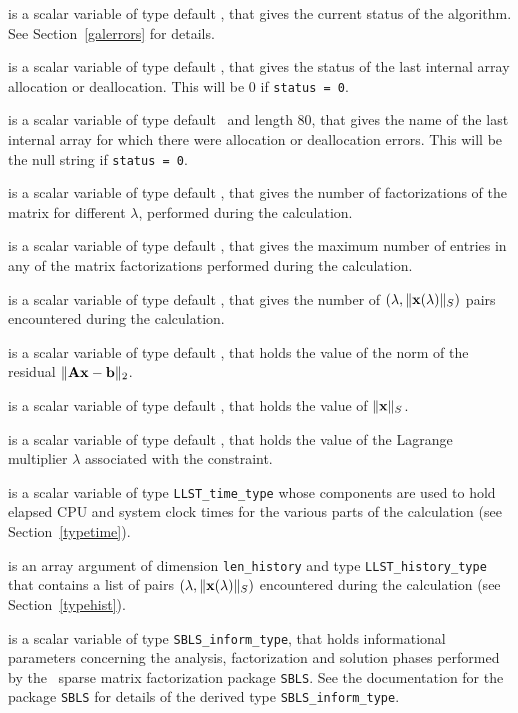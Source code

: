 \documentclass{galahad}
\newcommand{\packagename}{LLST}
\begin{document}
\begin{description}
 is a scalar variable of type default \integer, that gives the
current status of the algorithm. See Section~\ref{galerrors} for details.

 is a scalar variable of type default \integer,
that gives the status of the last internal array allocation
or deallocation. This will be 0 if {\tt status = 0}.

 is a scalar variable of type default \character\
and length 80, that  gives the name of the last internal array
for which there were allocation or deallocation errors.
This will be the null string if {\tt status = 0}.

 is a scalar variable of type default \integer, that
gives the number of factorizations of the matrix \req{kkt}
for different $\lambda$, performed during the calculation.

 is a scalar variable of type default \integer, that
gives the maximum number of entries in any of the matrix factorizations
performed during the calculation.

 is a scalar variable of type default \integer, that gives
the number of $(\lambda,\|{\mathbf{x}}(\lambda)\|_S)$ pairs encountered during the
calculation.

 is a scalar variable of type default \realdp, that holds the
value of the norm of the residual $\| {\mathbf{A}} {\mathbf{x}} - {\mathbf{b}}\|_2$.

 is a scalar variable of type default \realdp,
that holds the value of $\|{\mathbf{x}}\|_S$.

 is a scalar variable of type default \realdp, that holds the
value of the Lagrange multiplier $\lambda$ associated with the constraint.

 is a scalar variable of type {\tt \packagename\_time\_type}
whose components are used to hold elapsed CPU  and system clock times for the
various parts of the calculation (see Section~\ref{typetime}).

 is an array argument of dimension {\tt len\_history} and
type {\tt \packagename\_history\_type} that contains a list of pairs
$(\lambda,\|{\mathbf{x}}(\lambda)\|_S)$ encountered during the
calculation (see Section~\ref{typehist}).

 is a scalar variable of type {\tt SBLS\_inform\_type},
that holds informational parameters concerning the analysis, factorization
and solution phases performed by
the \galahad\ sparse matrix factorization package {\tt SBLS}.
See the documentation for the package {\tt SBLS} for details of the
derived type {\tt SBLS\_inform\_type}.


\end{description}
\end{document}
